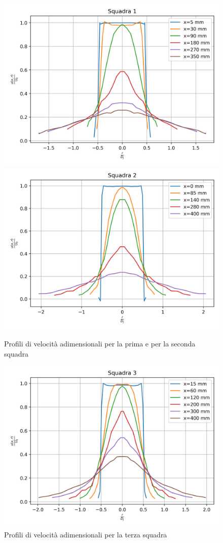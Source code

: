 \begin{figure}[H]
    \centering
    \includegraphics[width=.77\textwidth]{images/3/sq1u0.png}
    \includegraphics[width=.77\textwidth]{images/3/sq2u0.png}
    \caption{Profili di velocità adimensionali per la prima e per la seconda squadra}
\end{figure}
\begin{figure}[ht]
    \centering
    \includegraphics[width=.85\textwidth]{images/3/sq3u0.png}
    \caption{Profili di velocità adimensionali per la terza squadra}
\end{figure}
